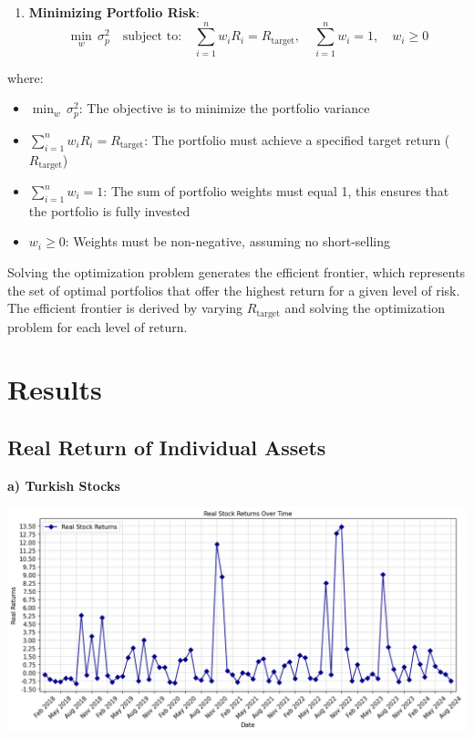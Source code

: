 \documentclass[
]{article}
\providecommand{\tightlist}{%
  \setlength{\itemsep}{0pt}\setlength{\parskip}{0pt}}
\begin{document}
\begin{enumerate}
\def\labelenumi{\arabic{enumi}.}
\setcounter{enumi}{2}
\tightlist
\item
  \textbf{Minimizing Portfolio Risk}: \[
  \min_{w} \, \sigma_p^2 \quad \text{subject to:} \quad \sum_{i=1}^{n} w_i R_i = R_{\text{target}}, \quad \sum_{i=1}^{n} w_i = 1, \quad w_i \geq 0
  \]
\end{enumerate}

where:

\begin{itemize}
\tightlist
\item
  \(\min_{w} \, \sigma_p^2\): The objective is to minimize the portfolio
  variance
\item
  \(\sum_{i=1}^{n} w_i R_i = R_{\text{target}}\): The portfolio must
  achieve a specified target return (\(R_{\text{target}}\))
\item
  \(\sum_{i=1}^{n} w_i = 1\): The sum of portfolio weights must equal 1,
  this ensures that the portfolio is fully invested
\item
  \(w_i \geq 0\): Weights must be non-negative, assuming no
  short-selling
\end{itemize}

Solving the optimization problem generates the efficient frontier, which
represents the set of optimal portfolios that offer the highest return
for a given level of risk. The efficient frontier is derived by varying
\(R_{\text{target}}\) and solving the optimization problem for each
level of return.

\section{Results}\label{results}
\subsection{Real Return of Individual Assets}
\textbf{a) Turkish Stocks}

\includegraphics[width=\textwidth]{figures/real-returns-stocks.png}
\end{document}
